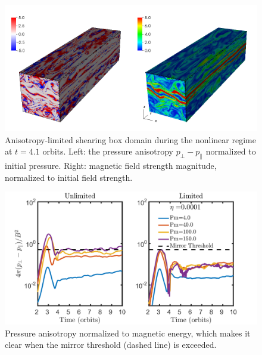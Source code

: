 %
\begin{figure}[h]
  \begin{center}  
    \includegraphics[width=\textwidth, angle=0.]{img/yca-eta1R1L1-13-PA-t41.png}
  \end{center}
  \caption{Anisotropy-limited shearing box domain during the nonlinear regime at $t=4.1$ orbits. Left: the pressure anisotropy $p_\perp-p_\parallel$ normalized to initial pressure. Right: magnetic field strength magnitude, normalized to initial field strength.}
  \label{fig:vtkPA}
\end{figure}
%
\begin{figure}[h]
  \begin{center}  
    \includegraphics[width=\textwidth, angle=0.]{img/eta1-Pm4-40-100-150-PAMElog.png}
  \end{center}
  \caption{Pressure anisotropy normalized to magnetic energy, which makes it clear when the mirror threshold (dashed line) is exceeded.}
  \label{fig:eta1PAMElog}
\end{figure}
%
